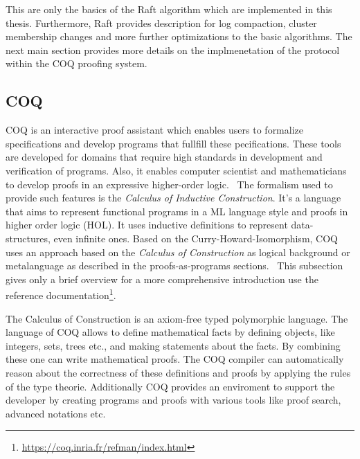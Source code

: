 \vspace{2em}

This are only the basics of the Raft algorithm which are implemented
in this thesis. Furthermore, Raft provides description for log compaction,
cluster membership changes and more further optimizations to the basic
algorithms. The next main section provides more details on the
implmenetation of the protocol within the COQ proofing system.

\subsection{COQ}
COQ is an interactive proof assistant which enables users to formalize
specifications and develop programs that fullfill these pecifications.
These tools are developed for domains that require high standards in
development and verification of programs. Also, it enables computer
scientist and mathematicians to develop proofs in an expressive
higher-order logic.~\cite{the_coq_development_team_2019_2554024}
The formalism used to provide such features is the \textit{Calculus of Inductive
  Construction}. It's a language that aims to represent functional programs
in a ML language style and proofs in higher order logic (HOL).
It uses inductive definitions to represent data-structures, even infinite
ones. Based on the Curry-Howard-Isomorphism, COQ uses an approach based
on the \textit{Calculus of Construction} as logical
background or metalanguage as described in the proofs-as-programs
sections.~\cite{the_coq_development_team_2019_2554024,
  paulinmohring:hal-01094195} This subsection gives only a brief overview
for a more comprehensive introduction use the reference documentation\footnote{\url{https://coq.inria.fr/refman/index.html}}.


The Calculus of Construction is an axiom-free typed polymorphic language.
The language of COQ allows to define mathematical facts by
defining objects, like integers, sets, trees etc., and making statements
about the facts. By combining these one can write mathematical proofs.
The COQ compiler can automatically reason about the correctness of these
definitions and proofs by applying the rules of the type theorie.
Additionally COQ provides an enviroment to support the developer by
creating programs and proofs with various tools like proof search, advanced
notations etc.~\cite{paulin2011introduction}

